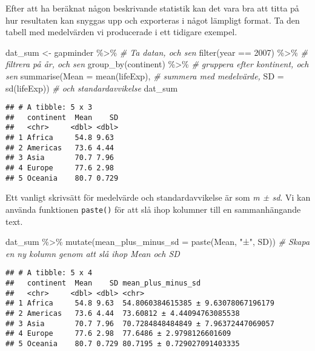 \documentclass[
]{book}
\newenvironment{Shaded}{\begin{snugshade}}{\end{snugshade}}
\newcommand{\AttributeTok}[1]{\textcolor[rgb]{0.77,0.63,0.00}{#1}}
\newcommand{\CommentTok}[1]{\textcolor[rgb]{0.56,0.35,0.01}{\textit{#1}}}
\newcommand{\DecValTok}[1]{\textcolor[rgb]{0.00,0.00,0.81}{#1}}
\newcommand{\FunctionTok}[1]{\textcolor[rgb]{0.00,0.00,0.00}{#1}}
\newcommand{\NormalTok}[1]{#1}
\newcommand{\OtherTok}[1]{\textcolor[rgb]{0.56,0.35,0.01}{#1}}
\newcommand{\SpecialCharTok}[1]{\textcolor[rgb]{0.00,0.00,0.00}{#1}}
\newcommand{\StringTok}[1]{\textcolor[rgb]{0.31,0.60,0.02}{#1}}
\theoremstyle{definition}
\theoremstyle{definition}
\theoremstyle{definition}
\theoremstyle{definition}
\theoremstyle{remark}
\begin{document}
Efter att ha beräknat någon beskrivande statistik kan det vara bra att titta på hur resultaten kan snyggas upp och exporteras i något lämpligt format. Ta den tabell med medelvärden vi producerade i ett tidigare exempel.

\begin{Shaded}
\begin{Highlighting}[]
\NormalTok{dat\_sum }\OtherTok{\textless{}{-}}\NormalTok{ gapminder }\SpecialCharTok{\%\textgreater{}\%}                         \CommentTok{\# Ta datan, och sen}
  \FunctionTok{filter}\NormalTok{(year }\SpecialCharTok{==} \DecValTok{2007}\NormalTok{) }\SpecialCharTok{\%\textgreater{}\%}                       \CommentTok{\# filtrera på år, och sen}
  \FunctionTok{group\_by}\NormalTok{(continent) }\SpecialCharTok{\%\textgreater{}\%}                        \CommentTok{\# gruppera efter kontinent, och sen}
  \FunctionTok{summarise}\NormalTok{(}\AttributeTok{Mean =} \FunctionTok{mean}\NormalTok{(lifeExp),                }\CommentTok{\# summera med medelvärde,}
            \AttributeTok{SD =} \FunctionTok{sd}\NormalTok{(lifeExp))                    }\CommentTok{\# och standardavvikelse}
\NormalTok{dat\_sum}
\end{Highlighting}
\end{Shaded}

\begin{verbatim}
## # A tibble: 5 x 3
##   continent  Mean    SD
##   <chr>     <dbl> <dbl>
## 1 Africa     54.8 9.63 
## 2 Americas   73.6 4.44 
## 3 Asia       70.7 7.96 
## 4 Europe     77.6 2.98 
## 5 Oceania    80.7 0.729
\end{verbatim}

Ett vanligt skrivsätt för medelvärde och standardavvikelse är som \emph{m ± sd}. Vi kan använda funktionen \texttt{paste()} för att slå ihop kolumner till en sammanhängande text.

\begin{Shaded}
\begin{Highlighting}[]
\NormalTok{dat\_sum }\SpecialCharTok{\%\textgreater{}\%} 
  \FunctionTok{mutate}\NormalTok{(}\AttributeTok{mean\_plus\_minus\_sd =} \FunctionTok{paste}\NormalTok{(Mean, }\StringTok{"±"}\NormalTok{, SD))        }\CommentTok{\# Skapa en ny kolumn genom att slå ihop Mean och SD}
\end{Highlighting}
\end{Shaded}

\begin{verbatim}
## # A tibble: 5 x 4
##   continent  Mean    SD mean_plus_minus_sd                 
##   <chr>     <dbl> <dbl> <chr>                              
## 1 Africa     54.8 9.63  54.8060384615385 ± 9.63078067196179
## 2 Americas   73.6 4.44  73.60812 ± 4.44094763085538        
## 3 Asia       70.7 7.96  70.7284848484849 ± 7.96372447069057
## 4 Europe     77.6 2.98  77.6486 ± 2.9798126601609          
## 5 Oceania    80.7 0.729 80.7195 ± 0.729027091403335
\end{verbatim}
\end{document}
